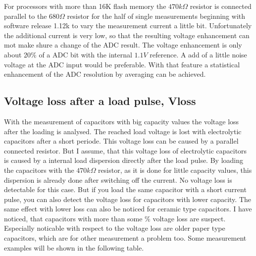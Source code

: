 For processors with more than 16K flash memory the \(470k\Omega\) resistor is connected parallel to the \(680\Omega\) resistor
for the half of single measurements beginning with software release 1.12k to vary the measurement current a little bit.
Unfortunately the additional current is very low, so that the resulting voltage enhancement can mot make shure a
change of the ADC result.
The voltage enhancement is only about 20\% of a ADC bit with the internal \(1.1V\) reference.
A add of a little noise voltage at the ADC input would be preferable.
With that feature a statistical enhancement of the ADC resolution by averaging can be achieved.
 


\subsection{Voltage loss after a load pulse, Vloss}
With the measurement of capacitors with big capacity values the voltage loss after the loading is analysed.
The reached load voltage is lost with electrolytic capacitors after a short periode.
This voltage loss can be caused by a parallel connected resistor.
But I assume, that this voltage loss of electrolytic capacitors is caused by a internal load dispersion directly
after the load pulse. By loading the capacitors with the \(470k\Omega\) resistor, as it is done for little
capacity values, this dispersion is already done after switching off the current.
No voltage loss is detectable for this case. But if you load the same capacitor with a short current pulse,
you can also detect the voltage loss for capacitors with lower capacity.
The same effect with lower loss can also be noticed for ceramic type capacitors. 
I have noticed, that capacitors with more than some \% voltage loss are suspect.
Especially noticable with respect to the voltage loss are older paper type capacitors, which are for other measurement
a problem too. Some measurement examples will be shown in the following table.
\vspace{0.5 cm}

